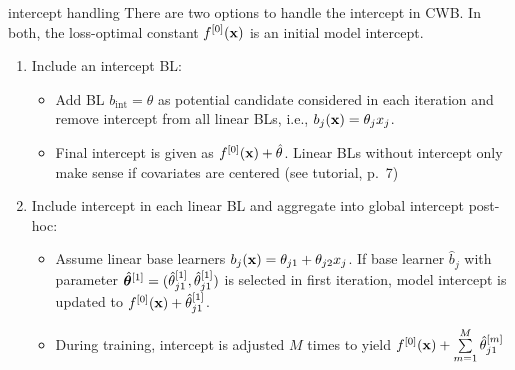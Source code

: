 \documentclass[11pt,compress,t,notes=noshow, xcolor=table]{beamer}
\begin{document}
\begin{vbframe}{intercept handling}
There are two options to handle the intercept in CWB. In both, the loss-optimal constant $f^{[0]}(\mathbf{x})$ is an initial model intercept. \\
\begin{enumerate}
\setlength{\itemsep}{0.8em}
\item {\small Include an intercept BL}:
  \begin{itemize}
    \setlength{\itemsep}{0.8em}
    \item {\footnotesize Add BL $b_{\text{int}} = \theta$ as potential candidate considered in each iteration and remove intercept from all linear BLs, i.e., $b_j(\mathbf{x}) = \theta_j x_j$.}
    \item {\footnotesize Final intercept is given as $f^{[0]}(\mathbf{x}) + \hat{\theta}$. Linear BLs without intercept only make sense if covariates are centered (see  tutorial, p.~7)}
  \end{itemize}
  
  
  \item {\small Include intercept in each linear BL and aggregate into global intercept post-hoc}:
  \begin{itemize} \setlength{\itemsep}{0.8em}
  \item  {\footnotesize Assume linear base learners $b_j(\mathbf{x}) = \theta_{j1} + \theta_{j2} x_j$. %
  If base learner $\hat{b}_j$ with parameter $\hat{\bm{\theta}}^{[1]} = (\hat{\theta}_{j1}^{[1]}, \hat{\theta}_{j1}^{[1]})$ is selected in first iteration, model intercept is updated to $f^{[0]}(\mathbf{x}) + \hat{\theta}_{j1}^{[1]}$.}
    \item {\footnotesize During training, intercept is adjusted $M$ times to yield $\fm[0](\xv) + \sum\limits_{m=1}^M %
    \hat{\theta}^{[m]}_{j1}$}
    \end{itemize}
\end{enumerate}

\end{vbframe}
\end{document}
